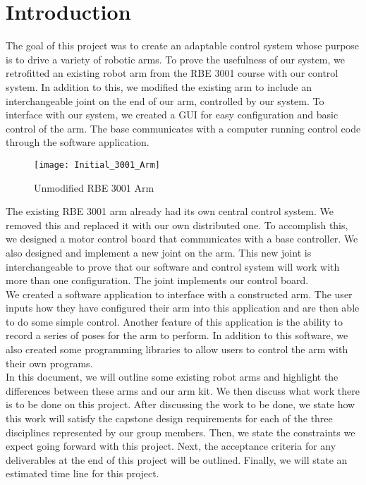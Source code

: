 \section{Introduction} 


The goal of this project was to create an adaptable control system whose purpose is to drive a variety of robotic arms. To prove the usefulness of our system, we retrofitted an existing robot arm from the RBE 3001 course with our control system.  In addition to this, we modified the existing arm to include an interchangeable joint on the end of our arm, controlled by our system. To interface with our system, we created a GUI for easy configuration and basic control of the arm. The base communicates with a computer running control code through the software application. \\
\newline

\begin{figure}[H]
\centering
\texttt{[image: Initial\_3001\_Arm]}
\caption{Unmodified RBE 3001 Arm}
\label{fig:Functional_Block_Diagram}
\end{figure}

\newline
The existing RBE 3001 arm already had its own central control system. We removed this and replaced it with our own distributed one. To accomplish this, we designed a motor control board that communicates with a base controller.  We also designed and implement a new joint on the arm. This new joint is interchangeable to prove that our software and control system will work with more than one configuration. The joint implements our control board. \\
\newline
We created a software application to interface with a constructed arm. The user inputs how they have configured their arm into this application and are then able to do some simple control. Another feature of this application is the ability to record a series of poses for the arm to perform. In addition to this software, we also created some programming libraries to allow users to control the arm with their own programs. \\
\newline
In this document, we will outline some existing robot arms and highlight the differences between these arms and our arm kit. We then discuss what work there is to be done on this project. After discussing the work to be done, we state how this work will satisfy the capstone design requirements for each of the three disciplines represented by our group members. Then, we state the constraints we expect going forward with this project. Next, the acceptance criteria for any deliverables at the end of this project will be outlined. Finally, we will state an estimated time line for this project.